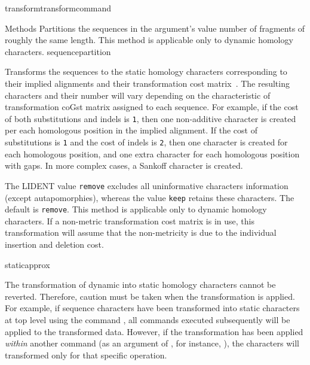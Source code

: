 \begin{command}{transform}{transformcommand}
\begin{arguments}
\begin{argumentgroup}{Methods}
            {Partitions the sequences in the argument's value number of
            fragments of roughly the same length. This method is applicable only to dynamic homology characters.}
            {sequencepartition}

            {Transforms the sequences to the static homology characters
            corresponding to their implied alignments and their transformation
            cost matrix~\cite{wheeler2003}. The resulting characters and their number will vary
            depending on the characteristic of transformation coGst matrix
            assigned to each sequence. For example, if the cost of both substitutions
            and indels is \texttt{1}, then one non-additive character is created per
            each homologous position in the implied alignment. If the cost of
            substitutions is \texttt{1} and the cost of indels  is \texttt{2}, then
            one character is created for each homologous position, and one extra character for
            each homologous position with gaps. In more complex cases, a Sankoff character is
            created.
            
            The LIDENT value \texttt{remove} excludes all uninformative characters
            information (except autapomorphies), whereas the value \texttt{keep}
            retains these characters. The default is \texttt{remove}. This
            method is applicable only to dynamic homology characters. If
            a non-metric transformation cost matrix is in use, this
            transformation will assume that the non-metricity is due to the
            individual insertion and deletion cost.}
            {staticapprox}
            
            \begin{statement}
  	  The transformation of dynamic into static homology characters cannot be reverted.
	  Therefore, caution must be taken when the transformation is applied. For example,
	  if sequence characters have been transformed into static characters at top level using
	  the command , all commands executed 
	  subsequently will be applied to the transformed data. However, if the transformation has 
	  been applied \emph{within} another command (as an argument of , 
	  for instance, ), the characters will transformed only for that specific operation.
	   \end{statement}
	

\end{argumentgroup}
\end{arguments}
\end{command}
